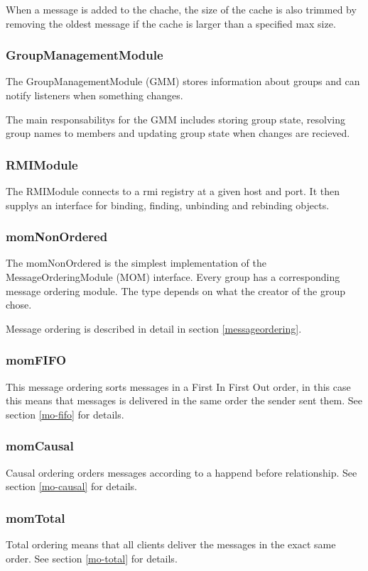 \documentclass[english]{article}
\begin{document}
When a message is added to the chache, the size of the cache is also trimmed by removing the oldest message if the cache is larger than a specified max size.

\subsubsection{GroupManagementModule}
The GroupManagementModule (GMM) stores information about groups and can notify listeners when something changes.

The main responsabilitys for the GMM includes storing group state, resolving group names to members and updating group state when changes are recieved.

\subsubsection{RMIModule}
The RMIModule connects to a rmi registry at a given host and port. It then supplys an interface for binding, finding, unbinding and rebinding objects.

\subsubsection{momNonOrdered}
The momNonOrdered is the simplest implementation of the MessageOrderingModule (MOM) interface. Every group has a corresponding message ordering module. The type depends on what the creator of the group chose. 

Message ordering is described in detail in section \vref{messageordering}.

\subsubsection{momFIFO}
This message ordering sorts messages in a First In First Out order, in this case this means that messages is delivered in the same order the sender sent them. See section \vref{mo-fifo} for details.


\subsubsection{momCausal}
Causal ordering orders messages according to a happend before relationship. See section \vref{mo-causal} for details.

\subsubsection{momTotal}
Total ordering means that all clients deliver the messages in the exact same order. See section \vref{mo-total} for details.
\end{document}
